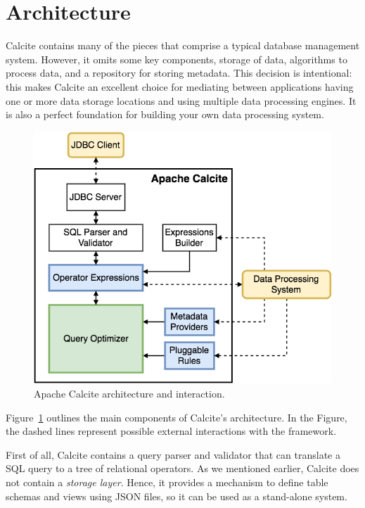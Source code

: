 \section{Architecture}
\label{sec:archi}

Calcite contains many of the pieces that comprise a typical database management system. However, it omits some key components, \eg storage of data, algorithms to process data, and a repository for storing metadata. This decision is intentional: this makes Calcite an excellent choice for mediating between applications having one or more data storage locations and using multiple data processing engines. It is also a perfect foundation for building your own data processing system.

\begin{figure}[t]
\centering
\includegraphics[width=0.94\columnwidth]{figures/architecture.png}
\caption{Apache Calcite architecture and interaction.\label{fig:arch}}
\end{figure}

Figure~\ref{fig:arch} outlines the main components of Calcite's architecture. In the Figure, the dashed lines represent possible external interactions with the framework.

First of all, Calcite contains a query parser and validator that can translate a SQL query to a tree of relational operators. As we mentioned earlier, Calcite does not contain a \textit{storage layer}. Hence, it provides a mechanism to define table schemas and views using JSON files, so it can be used as a stand-alone system.

